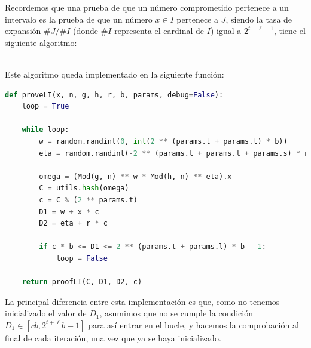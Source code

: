 Recordemos que una prueba de que un número comprometido pertenece a un intervalo es la prueba de que un número $x \in I$ pertenece a $J$, siendo la tasa de expansión $\#J/\#I$ (donde $\#I$ representa el cardinal de $I$) igual a $2^{t+\ell+1}$, tiene el siguiente algoritmo: \\
\begin{minipage}{0.9\textwidth}
    \begin{algorithm}[H]
        \caption{Prueba de intervalo mayor: $\operatorname{Prove_{LI}}$}


    \end{algorithm}
\end{minipage} \\
Este algoritmo queda implementado en la siguiente función:
\begin{lstlisting}[language=Python, basicstyle=\footnotesize]
def proveLI(x, n, g, h, r, b, params, debug=False):
    loop = True

    while loop:
        w = random.randint(0, int(2 ** (params.t + params.l) * b))
        eta = random.randint(-2 ** (params.t + params.l + params.s) * n + 1, 2 ** (params.t + params.l + params.s) * n - 1)

        omega = (Mod(g, n) ** w * Mod(h, n) ** eta).x
        C = utils.hash(omega)
        c = C % (2 ** params.t)
        D1 = w + x * c
        D2 = eta + r * c

        if c * b <= D1 <= 2 ** (params.t + params.l) * b - 1:
            loop = False

    return proofLI(C, D1, D2, c)
\end{lstlisting}
La principal diferencia entre esta implementación es que, como no tenemos inicializado el valor de $D_{1}$, asumimos que no se cumple la condición $D_{1} \in [cb, 2^{t+\ell}b -1]$ para así entrar en el bucle, y hacemos la comprobación al final de cada iteración, una vez que ya se haya inicializado.

